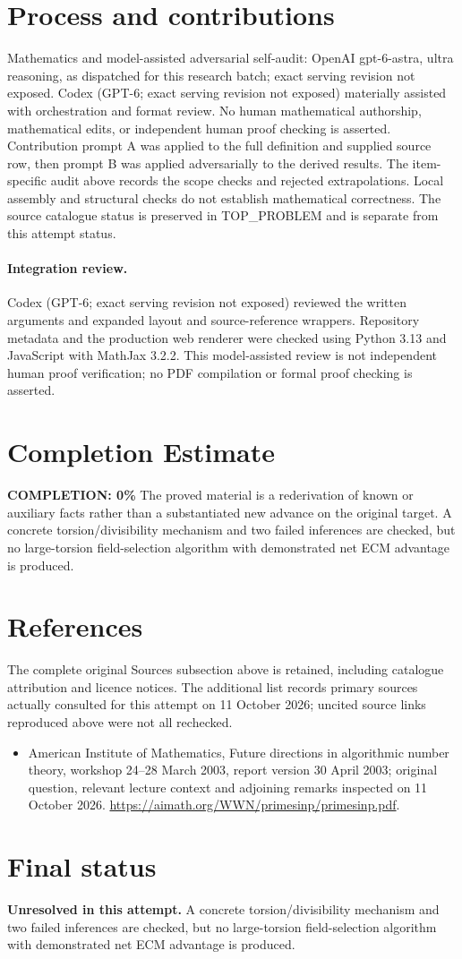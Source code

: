 \documentclass[11pt]{article}
\begin{document}
\section{Process and contributions}
Mathematics and model-assisted adversarial self-audit: OpenAI gpt-6-astra, ultra reasoning, as dispatched for this research batch; exact serving revision not exposed. Codex (GPT-6; exact serving revision not exposed) materially assisted with orchestration and format review. No human mathematical authorship, mathematical edits, or independent human proof checking is asserted.
Contribution prompt A was applied to the full definition and supplied source row, then prompt B was applied adversarially to the derived results. The item-specific audit above records the scope checks and rejected extrapolations. Local assembly and structural checks do not establish mathematical correctness. The source catalogue status is preserved in TOP\_PROBLEM and is separate from this attempt status.
\paragraph{Integration review.} Codex (GPT-6; exact serving revision not exposed) reviewed the written arguments and expanded layout and source-reference wrappers. Repository metadata and the production web renderer were checked using Python 3.13 and JavaScript with MathJax 3.2.2. This model-assisted review is not independent human proof verification; no PDF compilation or formal proof checking is asserted.

\section{Completion Estimate}
\noindent\textbf{COMPLETION: 0\%}
The proved material is a rederivation of known or auxiliary facts rather than a substantiated new advance on the original target. A concrete torsion/divisibility mechanism and two failed inferences are checked, but no large-torsion field-selection algorithm with demonstrated net ECM advantage is produced.
\section{References}
The complete original Sources subsection above is retained, including catalogue attribution and licence notices. The additional list records primary sources actually consulted for this attempt on 11 October 2026; uncited source links reproduced above were not all rechecked.
\begin{itemize}
\item American Institute of Mathematics, Future directions in algorithmic number theory, workshop 24--28 March 2003, report version 30 April 2003; original question, relevant lecture context and adjoining remarks inspected on 11 October 2026. \url{https://aimath.org/WWN/primesinp/primesinp.pdf}.
\end{itemize}
\section{Final status}
\textbf{Unresolved in this attempt.} A concrete torsion/divisibility mechanism and two failed inferences are checked, but no large-torsion field-selection algorithm with demonstrated net ECM advantage is produced.
\end{document}
